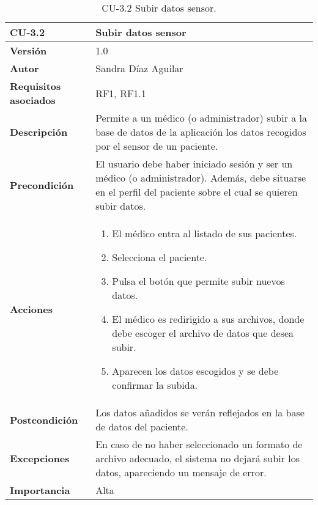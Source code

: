 \begin{table}[p]
	\centering
	\begin{tabularx}{\linewidth}{ p{} p{} }
		\toprule
		\textbf{CU-3.2}    & \textbf{Subir datos sensor}\\
		\toprule
		\textbf{Versión}              & 1.0    \\
		\textbf{Autor}                & Sandra Díaz Aguilar \\
		\textbf{Requisitos asociados} & RF1, RF1.1 \\
		\textbf{Descripción}          & Permite a un médico (o administrador) subir a la base de datos de la aplicación los datos recogidos por el sensor de un paciente.  \\
		\textbf{Precondición}         & El usuario debe haber iniciado sesión y ser un médico (o administrador). Además, debe situarse en el perfil del paciente sobre el cual se quieren subir datos.  \\
		\textbf{Acciones}             &
		\begin{enumerate}
			\def\labelenumi{\arabic{enumi}.}
			\tightlist
			\item El médico entra al listado de sus pacientes. 
			\item Selecciona el paciente. 
            \item Pulsa el botón que permite subir nuevos datos. 
            \item El médico es redirigido a sus archivos, donde debe escoger el archivo de datos que desea subir. 
            \item Aparecen los datos escogidos y se debe confirmar la subida. 
		\end{enumerate}\\
		\textbf{Postcondición}        & 	Los datos añadidos se verán reflejados en la base de datos del paciente. \\
		\textbf{Excepciones}          & En caso de no haber seleccionado un formato de archivo adecuado, el sistema no dejará subir los datos, apareciendo un mensaje de error.  \\
		\textbf{Importancia}          & Alta \\
		\bottomrule
	\end{tabularx}
	\caption{CU-3.2 Subir datos sensor.}
\end{table}


